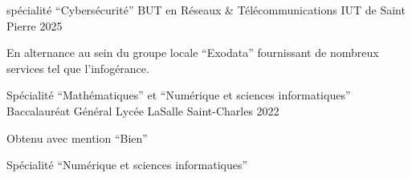 
\begin{cventries}
  \cventry
    {spécialité ``Cybersécurité''}
    {BUT en Réseaux \& Télécommunications}
    {IUT de Saint Pierre}
    {2025}
    {
      \begin{cvitems}
        \item {En alternance au sein du groupe locale ``Exodata'' fournissant de nombreux services tel que l'infogérance.}
      \end{cvitems}
    }

  \cventry
    {Spécialité ``Mathématiques'' et ``Numérique et sciences informatiques''}
    {Baccalauréat Général}
    {Lycée LaSalle Saint-Charles}
    {2022}
    {
      \begin{cvitems}
        \item {Obtenu avec mention ``Bien''}
        \item {Spécialité ``Numérique et sciences informatiques''}
      \end{cvitems}
    }
\end{cventries}
